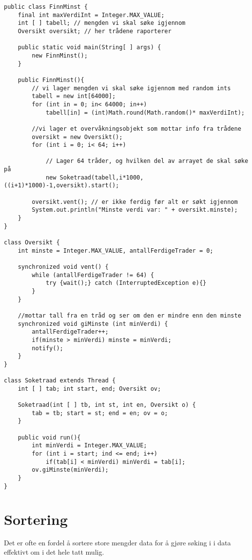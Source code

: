 \documentclass[11pt]{article}
\begin{document}
\begin{verbatim}
public class FinnMinst {
    final int maxVerdiInt = Integer.MAX_VALUE;
    int [ ] tabell; // mengden vi skal søke igjennom
    Oversikt oversikt; // her trådene raporterer

    public static void main(String[ ] args) {
        new FinnMinst();
    }

    public FinnMinst(){
        // vi lager mengden vi skal søke igjennom med random ints
        tabell = new int[64000];
        for (int in = 0; in< 64000; in++) 
            tabell[in] = (int)Math.round(Math.random()* maxVerdiInt);

        //vi lager et overvåkningsobjekt som mottar info fra trådene
        oversikt = new Oversikt();
        for (int i = 0; i< 64; i++)

            // Lager 64 tråder, og hvilken del av arrayet de skal søke på
            new Soketraad(tabell,i*1000,((i+1)*1000)-1,oversikt).start(); 

        oversikt.vent(); // er ikke ferdig før alt er søkt igjennom
        System.out.println("Minste verdi var: " + oversikt.minste);
    }
}

class Oversikt {
    int minste = Integer.MAX_VALUE, antallFerdigeTrader = 0;  
    
    synchronized void vent() {
        while (antallFerdigeTrader != 64) {
            try {wait();} catch (InterruptedException e){}      
        }
    } 

    //mottar tall fra en tråd og ser om den er mindre enn den minste
    synchronized void giMinste (int minVerdi) {
        antallFerdigeTrader++;
        if(minste > minVerdi) minste = minVerdi;      
        notify();
    }
}

class Soketraad extends Thread {
    int [ ] tab; int start, end; Oversikt ov;
  
    Soketraad(int [ ] tb, int st, int en, Oversikt o) {
        tab = tb; start = st; end = en; ov = o; 
    }
 
    public void run(){
        int minVerdi = Integer.MAX_VALUE;     
        for (int i = start; ind <= end; i++)
            if(tab[i] < minVerdi) minVerdi = tab[i];
        ov.giMinste(minVerdi);
    } 
}
\end{verbatim}
\section{Sortering}
\label{sec-12}

  Det er ofte en fordel å sortere store mengder data for å gjøre
  søking i i data effektivt om i det hele tatt mulig.
\end{document}
